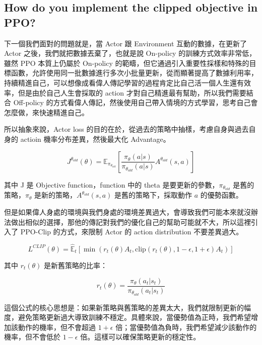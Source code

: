 \subsection{How do you implement the clipped objective in PPO?}

下一個我們面對的問題就是，當 Actor 跟 Environment 互動的數據，在更新了 Actor 之後，我們就把數據丟棄了，也就是說 On-policy 的訓練方式效率非常低，雖然 PPO \cite{schulman2017ppo} 本質上仍屬於 On-policy 的範疇，但它通過引入重要性採樣和特殊的目標函數，允許使用同一批數據進行多次小批量更新，從而顯著提高了數據利用率，持續精進自己，可以想像成看偉人傳記學習的過程肯定比自己活一個人生還有效率，但是由於自己人生會採取的 action 才對自己精進最有幫助，所以我們需要結合 Off-policy 的方式看偉人傳記，然後使用自己帶入情境的方式學習，思考自己會怎麼做，來快速精進自己。

所以抽象來說，Actor loss 的目的在於，從過去的策略中抽樣，考慮自身與過去自身的 actioin 機率分布差異，然後最大化 Advantage。

\begin{equation}
    J^{\theta_{old}}(\theta) = \mathbb{E}_{\pi_{\theta_{old}}}[\frac{\pi_\theta(a|s)}{\pi_{\theta_{old}}(a|s)}A^{\theta_{old}}(s,a)]
\end{equation}

其中 J 是 Objective function，function 中的 theta 是要更新的參數，$\pi_{\theta_{old}}$ 是舊的策略，$\pi_\theta$ 是新的策略，$A^{\theta_{old}}(s,a)$ 是舊的策略下，採取動作 $a$ 的優勢函數。

但是如果偉人身處的環境與我們身處的環境差異過大，會導致我們可能本來就沒辦法做出相似的選擇，那他的傳記對我們的優化自己的幫助可能就不大，所以這裡引入了 PPO-Clip 的方式，來限制 Actor 的 action distribution 不要差異過大。


\begin{equation}
    L^{CLIP}(\theta) = \hat{\mathbb{E}}_t[\min(r_t(\theta)A_t, \text{clip}(r_t(\theta), 1-\epsilon, 1+\epsilon)A_t)]
\end{equation}

其中 $r_t(\theta)$ 是新舊策略的比率：

\begin{equation}
    r_t(\theta) = \frac{\pi_\theta(a_t|s_t)}{\pi_{\theta_{old}}(a_t|s_t)}
\end{equation}

這個公式的核心思想是：如果新策略與舊策略的差異太大，我們就限制更新的幅度，避免策略更新過大導致訓練不穩定。具體來說，當優勢值為正時，我們希望增加該動作的機率，但不會超過 $1+\epsilon$ 倍；當優勢值為負時，我們希望減少該動作的機率，但不會低於 $1-\epsilon$ 倍。這樣可以確保策略更新的穩定性。

